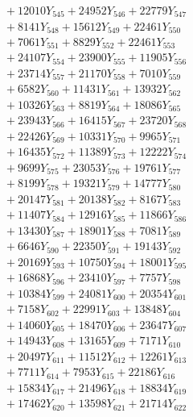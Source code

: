 \documentclass[a4paper,10pt]{article}
\begin{document}
{\begin{align}
&\;  + 12010 Y_{545} + 24952 Y_{546} + 22779 Y_{547} \\[0.3ex]
&\;  + 8141 Y_{548} + 15612 Y_{549} + 22461 Y_{550} \\[0.3ex]
&\;  + 7061 Y_{551} + 8829 Y_{552} + 22461 Y_{553} \\[0.3ex]
&\;  + 24107 Y_{554} + 23900 Y_{555} + 11905 Y_{556} \\[0.3ex]
&\;  + 23714 Y_{557} + 21170 Y_{558} + 7010 Y_{559} \\[0.3ex]
&\;  + 6582 Y_{560} + 11431 Y_{561} + 13932 Y_{562} \\[0.3ex]
&\;  + 10326 Y_{563} + 8819 Y_{564} + 18086 Y_{565} \\[0.3ex]
&\;  + 23943 Y_{566} + 16415 Y_{567} + 23720 Y_{568} \\[0.5ex]\allowbreak
&\;  + 22426 Y_{569} + 10331 Y_{570} + 9965 Y_{571} \\[0.3ex]
&\;  + 16435 Y_{572} + 11389 Y_{573} + 12222 Y_{574} \\[0.3ex]
&\;  + 9699 Y_{575} + 23053 Y_{576} + 19761 Y_{577} \\[0.3ex]
&\;  + 8199 Y_{578} + 19321 Y_{579} + 14777 Y_{580} \\[0.3ex]
&\;  + 20147 Y_{581} + 20138 Y_{582} + 8167 Y_{583} \\[0.3ex]
&\;  + 11407 Y_{584} + 12916 Y_{585} + 11866 Y_{586} \\[0.3ex]
&\;  + 13430 Y_{587} + 18901 Y_{588} + 7081 Y_{589} \\[0.3ex]
&\;  + 6646 Y_{590} + 22350 Y_{591} + 19143 Y_{592} \\[0.3ex]
&\;  + 20169 Y_{593} + 10750 Y_{594} + 18001 Y_{595} \\[0.3ex]
&\;  + 16868 Y_{596} + 23410 Y_{597} + 7757 Y_{598} \\[0.5ex]\allowbreak
&\;  + 10384 Y_{599} + 24081 Y_{600} + 20354 Y_{601} \\[0.3ex]
&\;  + 7158 Y_{602} + 22991 Y_{603} + 13848 Y_{604} \\[0.3ex]
&\;  + 14060 Y_{605} + 18470 Y_{606} + 23647 Y_{607} \\[0.3ex]
&\;  + 14943 Y_{608} + 13165 Y_{609} + 7171 Y_{610} \\[0.3ex]
&\;  + 20497 Y_{611} + 11512 Y_{612} + 12261 Y_{613} \\[0.3ex]
&\;  + 7711 Y_{614} + 7953 Y_{615} + 22186 Y_{616} \\[0.3ex]
&\;  + 15834 Y_{617} + 21496 Y_{618} + 18834 Y_{619} \\[0.3ex]
&\;  + 17462 Y_{620} + 13598 Y_{621} + 21714 Y_{622} \\[0.3ex]

\end{align}}
\end{document}
